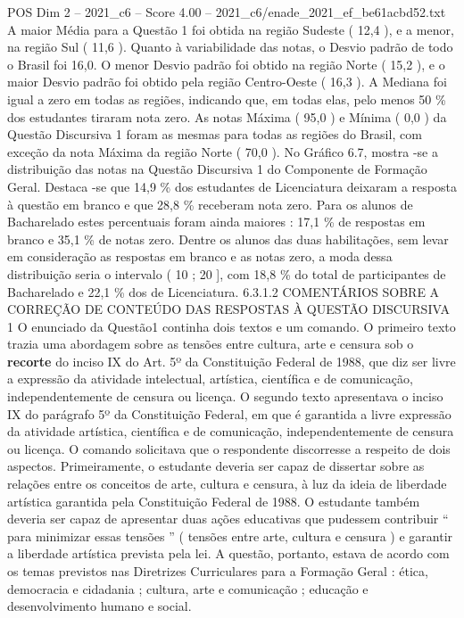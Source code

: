 \begin{textsample}{POS Dim 2 – 2021\_c6 – Score 4.00 – 2021\_c6/enade\_2021\_ef\_be61acbd52.txt}
A maior Média para a Questão 1 foi obtida na região Sudeste ( 12,4 ), e a menor, na região Sul ( 11,6 ).
Quanto à variabilidade das notas, o Desvio padrão de todo o Brasil foi 16,0.
O menor Desvio padrão foi obtido na região Norte ( 15,2 ), e o maior Desvio padrão foi obtido pela região Centro-Oeste ( 16,3 ).
A Mediana foi igual a zero em todas as regiões, indicando que, em todas elas, pelo menos 50 \% dos estudantes tiraram nota zero.
As notas Máxima ( 95,0 ) e Mínima ( 0,0 ) da Questão Discursiva 1 foram as mesmas para todas as regiões do Brasil, com exceção da nota Máxima da região Norte ( 70,0 ).
No Gráfico 6.7, mostra -se a distribuição das notas na Questão Discursiva 1 do Componente de Formação Geral.
Destaca -se que 14,9 \% dos estudantes de Licenciatura deixaram a resposta à questão em branco e que 28,8 \% receberam nota zero.
Para os alunos de Bacharelado estes percentuais foram ainda maiores : 17,1 \% de respostas em branco e 35,1 \% de notas zero.
Dentre os alunos das duas habilitações, sem levar em consideração as respostas em branco e as notas zero, a moda dessa distribuição seria o intervalo ( 10 ; 20 ], com 18,8 \% do total de participantes de Bacharelado e 22,1 \% dos de Licenciatura. 6.3.1.2 COMENTÁRIOS SOBRE A CORREÇÃO DE CONTEÚDO DAS RESPOSTAS À QUESTÃO DISCURSIVA 1 O enunciado da Questão1 continha dois textos e um comando.
O primeiro texto trazia uma abordagem sobre as tensões entre cultura, arte e censura sob o \textbf{recorte} do inciso IX do Art. 5º da Constituição Federal de 1988, que diz ser livre a expressão da atividade intelectual, artística, científica e de comunicação, independentemente de censura ou licença.
O segundo texto apresentava o inciso IX do parágrafo 5º da Constituição Federal, em que é garantida a livre expressão da atividade artística, científica e de comunicação, independentemente de censura ou licença.
O comando solicitava que o respondente discorresse a respeito de dois aspectos.
Primeiramente, o estudante deveria ser capaz de dissertar sobre as relações entre os conceitos de arte, cultura e censura, à luz da ideia de liberdade artística garantida pela Constituição Federal de 1988.
O estudante também deveria ser capaz de apresentar duas ações educativas que pudessem contribuir “ para minimizar essas tensões ” ( tensões entre arte, cultura e censura ) e garantir a liberdade artística prevista pela lei.
A questão, portanto, estava de acordo com os temas previstos nas Diretrizes Curriculares para a Formação Geral : ética, democracia e cidadania ; cultura, arte e comunicação ; educação e desenvolvimento humano e social.

\end{textsample}

